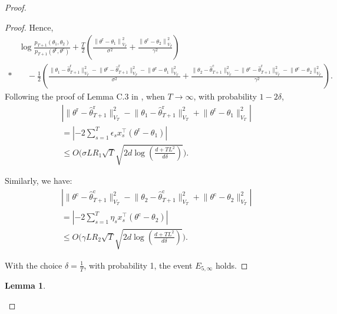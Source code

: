\documentclass[accepted]{uai2025} %
\theoremstyle{plain}
\newtheorem{lemma}[theorem]{Lemma}
\theoremstyle{definition}
\theoremstyle{remark}
\newcommand{\truethetac}{\theta^{\mathrm{c}}}
\newcommand{\truethetar}{\theta^{\mathrm{r}}}
\begin{document}
\begin{proof}
\begin{proof}
Hence, 
\begin{align*}
    &\log \frac{p_{T+1}(\theta_1, \theta_2)}{p_{T+1}(\truethetar, \truethetac)} 
    + \frac{T}{2} \left( \frac{\left\| \truethetar - \theta_1 \right\|^2_{\overline{V}_T}}{\sigma^2} + \frac{\left\| \truethetac - \theta_2 \right\|^2_{\overline{V}_T}}{\gamma^2} \right)  \\*
    & \quad -\frac{1}{2} \left( \frac{\lVert \theta_1 - \hat{\theta}^\mathrm{r}_{T+1} \rVert^2_{V_T} - \lVert \truethetar - \hat{\theta}^\mathrm{r}_{T+1} \rVert^2_{V_T} - \lVert \truethetar - \theta_1 \rVert^2_{V_T}}{\sigma^2}  + \frac{\lVert \theta_2 - \hat{\theta}^\mathrm{c}_{T+1} \rVert^2_{V_T} - \lVert \truethetac - \hat{\theta}^\mathrm{r}_{T+1} \rVert^2_{V_T} - \lVert \truethetac - \theta_2 \rVert^2_{V_T}}{\gamma^2} \right).
\end{align*}
Following the proof of Lemma C.3 in \cite{li2024optimal}, when \( T \to \infty \), with probability \( 1 - 2\delta \),
\begin{align*}
    & \left| \lVert \truethetar - \hat{\theta}^{\mathrm{r}}_{T+1} \rVert^2_{V_T} 
    - \lVert \theta_1 - \hat{\theta}^{\mathrm{r}}_{T+1} \rVert^2_{V_T} + \lVert \truethetar - \theta_1 \rVert^2_{V_T} \right| \\
    &= \left| - 2 \sum_{s=1}^{T} \epsilon_s x_s^\top (\truethetar - \theta_1) \right| \\
    &\leq O\bigg(\sigma L R_1 \sqrt{T} \sqrt{2d \log \left( \frac{d + T L^2}{d \delta} \right)}\bigg).
\end{align*}

Similarly, we have:
\begin{align*}
    & \left| \lVert \truethetac - \hat{\theta}^{\mathrm{c}}_{T+1} \rVert^2_{V_T} 
    - \lVert \theta_2 - \hat{\theta}^{\mathrm{c}}_{T+1} \rVert^2_{V_T} + \lVert \truethetac - \theta_2 \rVert^2_{V_T} \right| \\
    &= \left| - 2 \sum_{s=1}^{T} \eta_s x_s^\top (\truethetac - \theta_2) \right| \\
    &\leq O\bigg(\gamma L R_2 \sqrt{T} \sqrt{2d \log \left( \frac{d + T L^2}{d \delta} \right)}\bigg).
\end{align*}

With the choice \( \delta = \frac{1}{T} \), with probability 1, the event \( E_{5,\infty} \) holds.
\end{proof}



\begin{lemma}


\end{lemma}
\end{proof}
\end{document}
